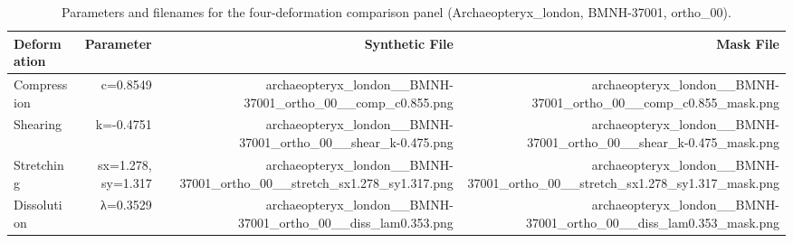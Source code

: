 \begin{table}[htbp]
\caption{Parameters and filenames for the four-deformation comparison panel (Archaeopteryx\_london, BMNH-37001, ortho\_00).}
\label{tab:4deformation_panel}
\begin{tabular}{lrrr}
\toprule
Deformation & Parameter & Synthetic File & Mask File \\
\midrule
Compression & c=0.8549 & archaeopteryx\_london\_\_BMNH-37001\_ortho\_00\_\_comp\_c0.855.png & archaeopteryx\_london\_\_BMNH-37001\_ortho\_00\_\_comp\_c0.855\_mask.png \\
Shearing & k=-0.4751 & archaeopteryx\_london\_\_BMNH-37001\_ortho\_00\_\_shear\_k-0.475.png & archaeopteryx\_london\_\_BMNH-37001\_ortho\_00\_\_shear\_k-0.475\_mask.png \\
Stretching & sx=1.278, sy=1.317 & archaeopteryx\_london\_\_BMNH-37001\_ortho\_00\_\_stretch\_sx1.278\_sy1.317.png & archaeopteryx\_london\_\_BMNH-37001\_ortho\_00\_\_stretch\_sx1.278\_sy1.317\_mask.png \\
Dissolution & λ=0.3529 & archaeopteryx\_london\_\_BMNH-37001\_ortho\_00\_\_diss\_lam0.353.png & archaeopteryx\_london\_\_BMNH-37001\_ortho\_00\_\_diss\_lam0.353\_mask.png \\
\bottomrule
\end{tabular}
\end{table}
